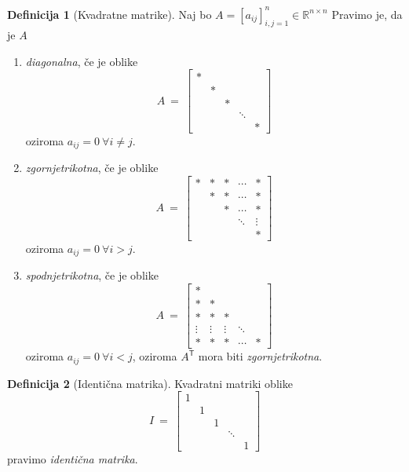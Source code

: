 \documentclass[11pt]{article}
\newcommand{\R}{\mathbb{R}}
\newcommand{\0}{\mathbf{0}}
\newcommand{\T}{\mathsf{T}}
\theoremstyle{definition}
\newtheorem{definicija}{Definicija}[section]
\theoremstyle{definition}
\theoremstyle{definition}
\theoremstyle{definition}
\begin{document}
\begin{definicija}[Kvadratne matrike]

Naj bo $A = [a_{ij}]_{i,j=1}^n \in \R^{n \times n}$ Pravimo je, da je $A$
\begin{enumerate}

\item \textit{diagonalna}, če je oblike
$$A ~=~ \begin{bmatrix}
* & ~ & ~ & ~ & ~ \\
~ & * & ~ & ~ & ~ \\
~ & ~ & * & ~ & ~ \\
~ & ~ & ~ & \ddots & ~ \\
~ & ~ & ~ & ~ & *
\end{bmatrix}$$
oziroma $a_{ij} = 0 ~\forall i \neq j$.

\item \textit{zgornjetrikotna}, če je oblike
$$A ~=~ \begin{bmatrix}
* & * & * & \cdots & * \\
~ & * & * & \cdots & * \\
~ & ~ & * & \cdots & * \\
~ & ~ & ~ & \ddots & \vdots \\
~ & ~ & ~ & ~ & *
\end{bmatrix}$$
oziroma $a_{ij} = 0 ~\forall i>j$.

\item \textit{spodnjetrikotna}, če je oblike
$$A ~=~ \begin{bmatrix}
* & ~ & ~ & ~ & ~ \\
* & * & ~ & ~ & ~ \\
* & * & * & ~ & ~ \\
\vdots & \vdots & \vdots & \ddots & ~ \\
* & * & * & \cdots & *
\end{bmatrix}$$
oziroma $a_{ij} = 0 ~\forall i<j$, oziroma $A^\T$ mora biti \textit{zgornjetrikotna}.

\end{enumerate}

\end{definicija}
\vspace{0.5cm}

\begin{definicija}[Identična matrika]

Kvadratni matriki oblike
$$I ~=~ \begin{bmatrix}
1 & ~ & ~ & ~ & ~ \\
~ & 1 & ~ & ~ & ~ \\
~ & ~ & 1 & ~ & ~ \\
~ & ~ & ~ & \ddots & ~ \\
~ & ~ & ~ & ~ & 1
\end{bmatrix}$$
pravimo \textit{identična matrika}.

\end{definicija}
\vspace{0.5cm}
\end{document}
